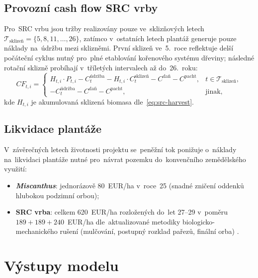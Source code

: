 \subsection{Provozní cash flow SRC vrby}
\label{subsec:cf_src}

Pro~SRC vrbu jsou tržby realizovány pouze ve~sklizňových letech
$\mathcal{T}_{\text{sklizeň}} = \{5, 8, 11, \ldots, 26\}$, zatímco
v~ostatních letech plantáž generuje pouze náklady na~údržbu mezi
sklizněmi. První sklizeň ve~5.~roce reflektuje delší počáteční cyklus
nutný pro~plné etablování kořenového systému dřeviny; následné rotační
sklizně probíhají v~tříletých intervalech až do~26.~roku:
\begin{equation}
    CF_{t,i} = \begin{cases}
        H_{t,i} \cdot P_{t,i} - C_t^{\text{údržba}}
        - H_{t,i} \cdot C_t^{\text{sklizeň}}
        - C^{\text{daň}} - C^{\text{pacht}},
        & t \in \mathcal{T}_{\text{sklizeň}}, \\[4pt]
        - C_t^{\text{údržba}} - C^{\text{daň}} - C^{\text{pacht}},
        & \text{jinak},
    \end{cases}
    \label{eq:cf_src}
\end{equation}
kde $H_{t,i}$ je akumulovaná sklizená biomasa dle~\eqref{eq:src-harvest}.

\subsection{Likvidace plantáže}
\label{subsec:cf_likvidace}

V~závěrečných letech životnosti projektu se~peněžní tok ponižuje
o~náklady na~likvidaci plantáže nutné pro~návrat pozemku
do~konvenčního zemědělského využití:
\begin{itemize}
    \item \textbf{\textit{Miscanthus}}: jednorázově 80~EUR/ha v~roce~25
          (snadné zničení oddenků hlubokou podzimní orbou);
    \item \textbf{SRC vrba}: celkem 620~EUR/ha rozložených do~let 27--29
          v~poměru $189 + 189 + 240$~EUR/ha dle~aktualizované metodiky
          biologicko-mechanického rušení (mulčování, postupný rozklad
          pařezů, finální orba) \citep{VUKOZ2026}.
\end{itemize}



\section{Výstupy modelu}
\label{sec:vystupy}

